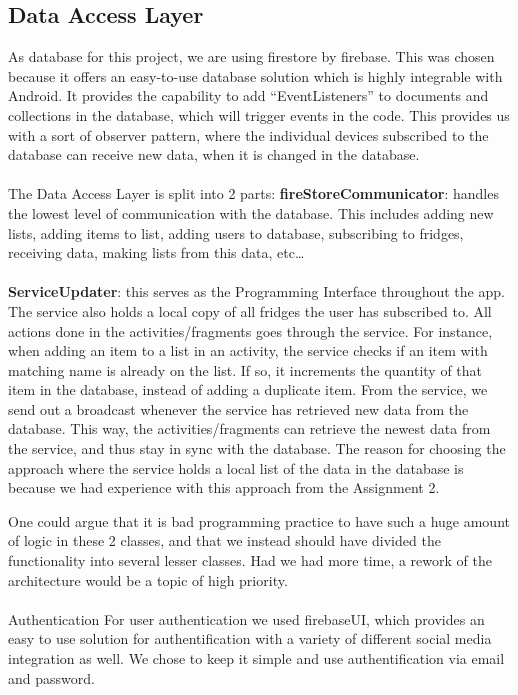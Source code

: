 \documentclass[12pt]{article}
\begin{document}
\subsection{Data Access Layer}
As database for this project, we are using firestore by firebase. This was chosen because it offers an easy-to-use database solution which is highly integrable with Android. It provides the capability to add “EventListeners” to documents and collections in the database, which will trigger events in the code. This provides us with a sort of observer pattern, where the individual devices subscribed to the database can receive new data, when it is changed in the database.
\\
\\
The Data Access Layer is split into 2 parts: \textbf{fireStoreCommunicator}: handles the lowest level of communication with the database. This includes adding new lists, adding items to list, adding users to database, subscribing to fridges, receiving data, making lists from this data, etc…
\\
\\
\textbf{ServiceUpdater}: this serves as the Programming Interface throughout the app. The service also holds a local copy of all fridges the user has subscribed to. All actions done in the activities/fragments goes through the service. For instance, when adding an item to a list in an activity, the service checks if an item with matching name is already on the list. If so, it increments the quantity of that item in the database, instead of adding a duplicate item.
From the service, we send out a broadcast whenever the service has retrieved new data from the database. This way, the activities/fragments can retrieve the newest data from the service, and thus stay in sync with the database.
The reason for choosing the approach where the service holds a local list of the data in the database is because we had experience with this approach from the Assignment 2.


One could argue that it is bad programming practice to have such a huge amount of logic in these 2 classes, and that we instead should have divided the functionality into several lesser classes. Had we had more time, a rework of the architecture would be a topic of high priority.
\\
\\
Authentication
For user authentication we used firebaseUI, which provides an easy to use solution for authentification with a variety of different social media integration as well. We chose to keep it simple and use authentification via email and password.
\end{document}
